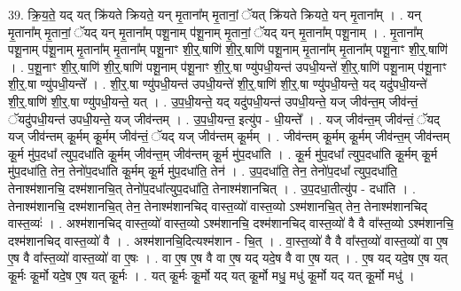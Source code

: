 \documentclass[17pt]{extarticle}
\begin{document}
39. क्रि॒य॒ते॒ यद् यत् क्रि॑यते क्रियते॒ यन् मृ॒ताना᳚म् मृ॒तानां॒ ॅयत् क्रि॑यते क्रियते॒ यन् मृ॒ताना᳚म् । . यन् मृ॒ताना᳚म् मृ॒तानां॒ ॅयद् यन् मृ॒ताना᳚म् पशू॒नाम् प॑शू॒नाम् मृ॒तानां॒ ॅयद् यन् मृ॒ताना᳚म् पशू॒नाम् । . मृ॒ताना᳚म् पशू॒नाम् प॑शू॒नाम् मृ॒ताना᳚म् मृ॒ताना᳚म् पशू॒नाꣳ शी॒र्॒.षाणि॑ शी॒र्॒.षाणि॑ पशू॒नाम् मृ॒ताना᳚म् मृ॒ताना᳚म् पशू॒नाꣳ शी॒र्॒.षाणि॑ । . प॒शू॒नाꣳ शी॒र्॒.षाणि॑ शी॒र्॒.षाणि॑ पशू॒नाम् प॑शू॒नाꣳ शी॒र्॒.षा ण्यु॑पधी॒यन्त॑ उपधी॒यन्ते॑ शी॒र्॒.षाणि॑ पशू॒नाम् प॑शू॒नाꣳ शी॒र्॒.षा ण्यु॑पधी॒यन्ते᳚ । . शी॒र्॒.षा ण्यु॑पधी॒यन्त॑ उपधी॒यन्ते॑ शी॒र्॒.षाणि॑ शी॒र्॒.षा ण्यु॑पधी॒यन्ते॒ यद् यदु॑पधी॒यन्ते॑ शी॒र्॒.षाणि॑ शी॒र्॒.षा ण्यु॑पधी॒यन्ते॒ यत् । . उ॒प॒धी॒यन्ते॒ यद् यदु॑पधी॒यन्त॑ उपधी॒यन्ते॒ यज् जीव॑न्त॒म् जीव॑न्तं॒ ॅयदु॑पधी॒यन्त॑ उपधी॒यन्ते॒ यज् जीव॑न्तम् । . उ॒प॒धी॒यन्त॒ इत्यु॑प - धी॒यन्ते᳚ । . यज् जीव॑न्त॒म् जीव॑न्तं॒ ॅयद् यज् जीव॑न्तम् कू॒र्मम् कू॒र्मम् जीव॑न्तं॒ ॅयद् यज् जीव॑न्तम् कू॒र्मम् । . जीव॑न्तम् कू॒र्मम् कू॒र्मम् जीव॑न्त॒म् जीव॑न्तम् कू॒र्म मु॑प॒दधा᳚ त्युप॒दधा॑ति कू॒र्मम् जीव॑न्त॒म् जीव॑न्तम् कू॒र्म मु॑प॒दधा॑ति । . कू॒र्म मु॑प॒दधा᳚ त्युप॒दधा॑ति कू॒र्मम् कू॒र्म मु॑प॒दधा॑ति॒ तेन॒ तेनो॑प॒दधा॑ति कू॒र्मम् कू॒र्म मु॑प॒दधा॑ति॒ तेन॑ । . उ॒प॒दधा॑ति॒ तेन॒ तेनो॑प॒दधा᳚ त्युप॒दधा॑ति॒ तेनाश्म॑शानचि॒ दश्म॑शानचि॒त् तेनो॑प॒दधा᳚त्युप॒दधा॑ति॒ तेनाश्म॑शानचित् । . उ॒प॒दधा॒तीत्यु॑प - दधा॑ति । . तेनाश्म॑शानचि॒ दश्म॑शानचि॒त् तेन॒ तेनाश्म॑शानचिद् वास्त॒व्यो॑ वास्त॒व्यो ऽश्म॑शानचि॒त् तेन॒ तेनाश्म॑शानचिद् वास्त॒व्यः॑ । . अश्म॑शानचिद् वास्त॒व्यो॑ वास्त॒व्यो ऽश्म॑शानचि॒ दश्म॑शानचिद् वास्त॒व्यो॑ वै वै वा᳚स्त॒व्यो ऽश्म॑शानचि॒ दश्म॑शानचिद् वास्त॒व्यो॑ वै । . अश्म॑शानचि॒दित्यश्म॑शान - चि॒त् । . वा॒स्त॒व्यो॑ वै वै वा᳚स्त॒व्यो॑ वास्त॒व्यो॑ वा ए॒ष ए॒ष वै वा᳚स्त॒व्यो॑ वास्त॒व्यो॑ वा ए॒षः । . वा ए॒ष ए॒ष वै वा ए॒ष यद् यदे॒ष वै वा ए॒ष यत् । . ए॒ष यद् यदे॒ष ए॒ष यत् कू॒र्मः कू॒र्मो यदे॒ष ए॒ष यत् कू॒र्मः । . यत् कू॒र्मः कू॒र्मो यद् यत् कू॒र्मो मधु॒ मधु॑ कू॒र्मो यद् यत् कू॒र्मो मधु॑ । \newline
\pagebreak
{}
\end{document}
